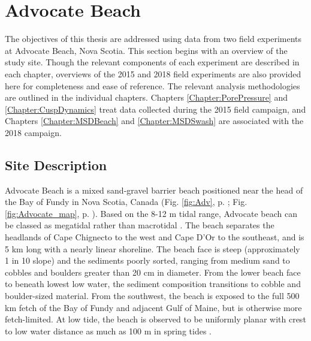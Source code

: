 \chapter{Advocate Beach}\label{Chapter:AdvocateBeach} 

The objectives of this thesis are addressed using data from two field experiments at Advocate Beach, Nova Scotia. This section begins with an overview of the study site. Though the relevant components of each experiment are described in each chapter, overviews of the 2015 and 2018 field experiments are also provided here for completeness and ease of reference. The relevant analysis methodologies are outlined in the individual chapters. Chapters \ref{Chapter:PorePressure} and \ref{Chapter:CuspDynamics} treat data collected during the 2015 field campaign, and Chapters \ref{Chapter:MSDBeach} and \ref{Chapter:MSDSwash} are associated with the 2018 campaign.



\section{Site Description}


Advocate Beach is a mixed sand-gravel barrier beach positioned near the head of the Bay of Fundy in Nova Scotia, Canada (Fig. \ref{fig:Adv}, p. \pageref{fig:Adv}; Fig. \ref{fig:Advocate_map}, p. \pageref{fig:Advocate_map}). Based on the 8-12 m tidal range, Advocate beach can be classed as megatidal rather than macrotidal \citep{Levoy_etal2000}. The beach separates the headlands of Cape Chignecto to the west and Cape D'Or to the southeast, and is 5 km long with a nearly linear shoreline. The beach face is steep (approximately 1 in 10 slope) and the sediments poorly sorted, ranging from medium sand to cobbles and boulders greater than 20 cm in diameter. From the lower beach face to beneath lowest low water, the sediment composition transitions to cobble and boulder-sized material. From the southwest, the beach is exposed to the full 500 km fetch of the Bay of Fundy and adjacent Gulf of Maine, but is otherwise more fetch-limited. At low tide, the beach is observed to be uniformly planar with crest to low water distance as much as 100 m in spring tides \citep[see][]{Taylor_etal1985, Hay_etal2014}. 

